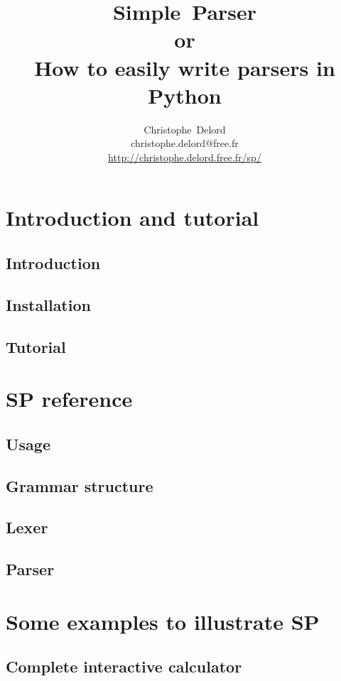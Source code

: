 \documentclass[a4paper,twoside]{report}
\author{
    Christophe~Delord\\
    christophe.delord@free.fr \\
    \url{http://christophe.delord.free.fr/sp/} \\
}
\title{
    Simple~Parser \\
    or\\
    How to easily write parsers in Python \\
}
\begin{document}
\maketitle
\tableofcontents

\listoffigures

\cleardoublepage
\part{Introduction and tutorial}                            \label{sp:intro}
    \chapter{Introduction}
        
    \chapter{Installation}
        
    \chapter{Tutorial}                                      \label{sp:tutorial}
        

\cleardoublepage
\part{SP reference}                                        \label{sp:core}
    \chapter{Usage}
        
    \chapter{Grammar structure}
        
    \chapter{Lexer}
        
    \chapter{Parser}
        

\cleardoublepage
\part{Some examples to illustrate SP}                       \label{sp:examples}
    \chapter{Complete interactive calculator}
        
\end{document}
